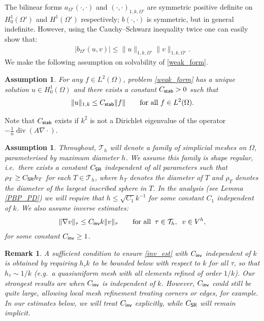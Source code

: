 \documentclass[numbers,webpdf,imaiai]{ima-authoring-template}%
\theoremstyle{thmstyletwo}%
\newtheorem{assumption}[theorem]{Assumption}%
\newtheorem{remark}[theorem]{Remark}
\numberwithin{equation}{section}
\newcommand{\shapereg}{C_{\textup{\textsf{SR}}}}
\newcommand{\Cinv}{C_{\textup{\textsf{inv}}}}
\numberwithin{equation}{section}
\DeclareMathOperator{\diverg}{div}
\newcommand{\Cstab}{C_{\textup{\textsf{stab}}}}
\renewcommand{\kappa}{k}
\begin{document}
{The bilinear forms $a_{\Omega'}(\cdot,\cdot )$ and $(\cdot,\cdot)_{1,\kappa, \Omega'}$ are symmetric positive definite 
on $H_0^1(\Omega')$ and $H^1(\Omega')$ respectively; $b(\cdot,\cdot)$ is symmetric, but in general indefinite.
However, using the Cauchy--Schwarz inequality twice one can easily show that: 
\begin{align}
	|b_{\Omega'}(u,v)| \le \|u\|_{1,k,\Omega'}\|v\|_{1,k,\Omega'}.  \label{lem:est_b} 
\end{align}
We make the following assumption on solvability of \eqref{weak_form}.

\begin{assumption}
\label{Ass: 2_3}
For any $f\in L^2(\Omega)$, problem \eqref{weak_form} has a unique solution $u \in H_0^1(\Omega)$ and 
there exists a constant $\Cstab>0$ such that%
\begin{equation}
\label{eq: 2_10}
	\|u\|_{1,\kappa}  \le \Cstab \|f\| \qquad \text{for all} \ f\in L^2(\Omega). 
\end{equation}
\end{assumption}

\noindent 
Note that $\Cstab$ exists if $k^2$ is not a Dirichlet eigenvalue of the operator $-\frac{1}{n}\diverg(A\nabla\cdot)$.

\begin{assumption}\label{ass:mesh} 
Throughout, $\mathcal{T}_h$ will denote a family of simplicial meshes on $\Omega$, parameterised by maximum diameter $h$. 
We assume this family is \textit{shape regular}, i.e.\ there exists a constant  $\shapereg$ independent of all parameters 
such that $\rho_T \ge \shapereg h_T$ for each $T \in \mathcal{T}_h$, where $h_T$ denotes the diameter of $T$ 
and $\rho_T$ denotes the diameter of the largest inscribed sphere in $T$.  
In the analysis (see Lemma \ref{PBP_PD}) we will require that $h \leq \sqrt{C_1} k^{-1}$ for some constant $C_1$ independent of $k$.
We also assume inverse estimates:
\begin{align} \label{inv_est}
  \|\nabla v \|_{\tau} \leq \Cinv k  \|v\|_{\tau} \qquad \text{for all}
  \;\; \tau \in \mathcal{T}_h, \;\; v \in V^h, 
\end{align}
for some constant $\Cinv\ge1$.   
\end{assumption}

\begin{remark}
A sufficient condition to ensure
\eqref{inv_est} with $\Cinv$ independent of $k$ is obtained by requiring $h_\tau k$
to be bounded below with respect to $k$ for all $\tau$, so that  $h_\tau \sim 1/k$ 
(e.g.\ a quasiuniform mesh with all elements refined of order $1/k$). 
Our strongest results are when $\Cinv$ is independent of $k$.   
However, $\Cinv$ could still be quite large, allowing local mesh refinement treating corners or edges, for example.
In our estimates below, we will treat $\Cinv$ explicitly, while $\shapereg$ will remain implicit. 
\end{remark}



}
\end{document}

